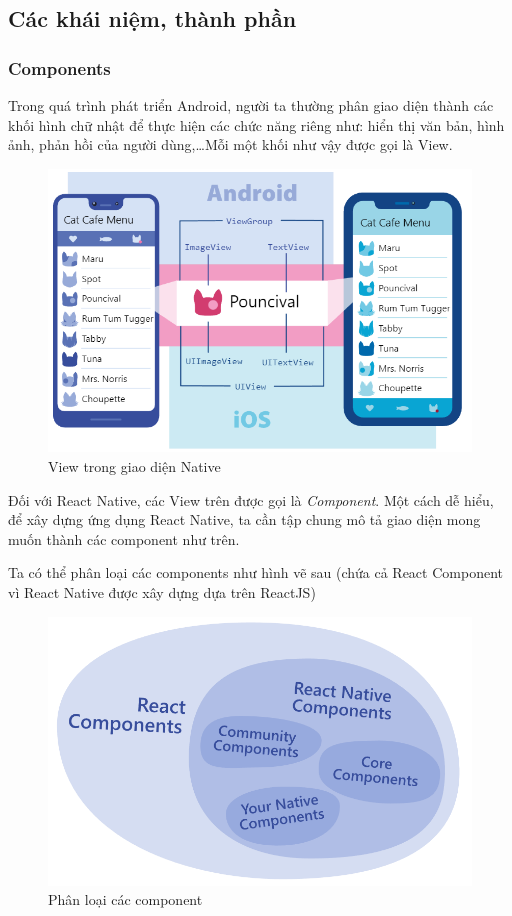 \subsection{Các khái niệm, thành phần}
\subsubsection{Components}
    Trong quá trình phát triển Android, người ta thường phân giao diện thành các khối hình chữ nhật để thực hiện các chức năng riêng như: hiển thị văn bản, hình ảnh, phản hồi của người dùng,\dots Mỗi một khối như vậy được gọi là View.
    \begin{figure}[!ht]
        \centering
        \includegraphics[scale=0.5]{images/nativeViewComponent.png}
        \caption{View trong giao diện Native}
    \end{figure}

    Đối với React Native, các View trên được gọi là \textit{Component}. Một cách dễ hiểu, để xây dựng ứng dụng React Native, ta cần tập chung mô tả giao diện mong muốn thành các component như trên.

    Ta có thể phân loại các components như hình vẽ sau (chứa cả React Component vì React Native được xây dựng dựa trên ReactJS)
    \begin{figure}[!ht]
        \centering
        \includegraphics[scale=0.5]{images/reactComponents.png}
        \caption{Phân loại các component}
    \end{figure}

